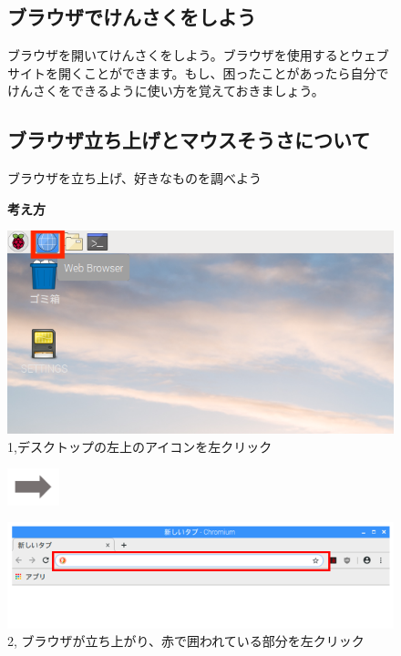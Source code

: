 \documentclass[a4paper,12pt]{jarticle}
\begin{document}
\clearpage
\begin{figure}[t]
  \subsection{ブラウザでけんさくをしよう}
  ブラウザを開いてけんさくをしよう。ブラウザを使用するとウェブサイトを開くことができます。もし、困ったことがあったら自分でけんさくをできるように使い方を覚えておきましょう。

  \subsection{\theExercise
    ブラウザ立ち上げとマウスそうさについて}
  ブラウザを立ち上げ、好きなものを調べよう

  {\bf\large 考え方}

  \begin{minipage}{\textwidth}
    \begin{minipage}{0.45\textwidth}
      \includegraphics[width=\linewidth]{textbook-img071.png}
      1,デスクトップの左上のアイコンを左クリック
    \end{minipage}
    \includegraphics[width=1.505cm]{textbook-img073.png}
    \begin{minipage}{0.45\textwidth}
      \includegraphics[width=\linewidth]{textbook-img075.png}
      2,
      ブラウザが立ち上がり、赤で囲われている部分を左クリック
    \end{minipage}
  \end{minipage}


\end{figure}
\end{document}
